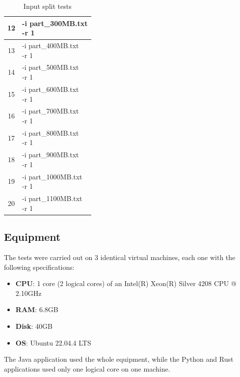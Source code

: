 \documentclass{article}
\begin{document}
\begin{multicols}{2}
\begin{table}[H]
\begin{tabular}{|c|l|}
            12 & \makecell[l]{-i part\_300MB.txt \\ -r 1} \\        
            \hline
            13 & \makecell[l]{-i part\_400MB.txt \\ -r 1} \\        
            \hline
            14 & \makecell[l]{-i part\_500MB.txt \\ -r 1} \\        
            \hline
            15 & \makecell[l]{-i part\_600MB.txt \\ -r 1} \\        
            \hline
            16 & \makecell[l]{-i part\_700MB.txt \\ -r 1} \\        
            \hline
            17 & \makecell[l]{-i part\_800MB.txt \\ -r 1} \\        
            \hline
            18 & \makecell[l]{-i part\_900MB.txt \\ -r 1} \\        
            \hline
            19 & \makecell[l]{-i part\_1000MB.txt \\ -r 1} \\        
            \hline
            20 & \makecell[l]{-i part\_1100MB.txt \\ -r 1} \\            
            \hline
        \end{tabular}
        \caption{Input split tests}
        \label{tab:input_split_tests}
    \end{table}
    \subsection{Equipment}
        The tests were carried out on 3 identical virtual machines, each one with the following specifications:
        \begin{itemize}
            \item \textbf{CPU}: 1 core (2 logical cores) of an Intel(R) Xeon(R) Silver 4208 CPU @ 2.10GHz
            \item \textbf{RAM}: 6.8GB
            \item \textbf{Disk}: 40GB
            \item \textbf{OS}: Ubuntu 22.04.4 LTS
        \end{itemize}
        The Java application used the whole equipment, while the Python and Rust applications used only one 
        logical core on one machine.

\end{multicols}
\end{document}
